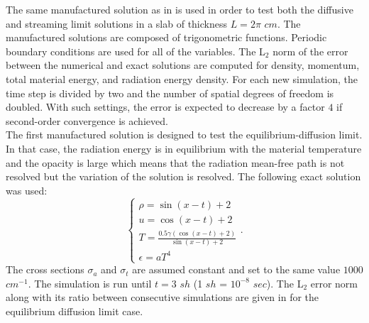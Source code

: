 The same manufactured solution as in \cite{EdwardsMorelLowrie} is used in order to test both the diffusive and streaming limit solutions in a slab of thickness $L=2 \pi$ $cm$. The manufactured solutions are composed of trigonometric functions. Periodic boundary conditions are used for all of the variables. The L$_2$ norm of the error between the numerical and exact solutions are computed for density, momentum, total material energy, and radiation energy density. For each new simulation, the time step is divided by two and the  number of spatial degrees of freedom is doubled. With such settings, the error is expected to decrease by a factor $4$ if second-order convergence is achieved. \\
The first manufactured solution is designed to test the equilibrium-diffusion limit. In that case, the radiation energy is in equilibrium with the material temperature and the opacity is large which means that the radiation mean-free path is not resolved but the variation of the solution is resolved. The following exact solution was used:
\begin{equation}
\label{eq:equation13}
\left\{
\begin{array}{llll}
\rho = \sin (x-t)+2 \\
u = \cos(x-t) +2 \\
T = \frac{0.5 \gamma (\cos(x-t) +2) }{\sin (x-t)+2}\\
\epsilon = a T^4
\end{array}
\right. .
\end{equation}
The cross sections $\sigma_a$ and $\sigma_t$ are assumed constant and set to the same value $1000$ $cm^{-1}$. The simulation is run until $t=3$ $sh$
(1 $sh$ = $10^{-8}$ $sec$). The L$_2$ error norm along with its ratio between consecutive simulations are given in  for the equilibrium diffusion limit case.

